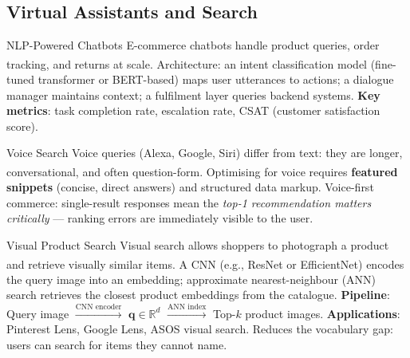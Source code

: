 \subsection{Virtual Assistants and Search}


\begin{v3topic}{NLP-Powered Chatbots}
    E-commerce chatbots handle product queries, order tracking, and returns at scale\textsuperscript{\cite[][pp.~150--155]{chaffeyDigitalBusinessECommerce2019}}.
    Architecture: an intent classification model (fine-tuned transformer or BERT-based) maps user utterances to actions; a dialogue manager maintains context; a fulfilment layer queries backend systems.
    \textbf{Key metrics}: task completion rate, escalation rate, CSAT (customer satisfaction score).

\end{v3topic}
\begin{v3topic}{Voice Search}
    Voice queries (Alexa, Google, Siri) differ from text: they are longer, conversational, and often question-form\textsuperscript{\cite[][pp.~155--158]{chaffeyDigitalBusinessECommerce2019}}.
    Optimising for voice requires \textbf{featured snippets} (concise, direct answers) and structured data markup.
    Voice-first commerce: single-result responses mean the \emph{top-1 recommendation matters critically} --- ranking errors are immediately visible to the user.

\end{v3topic}
\begin{v3topic}{Visual Product Search}
    Visual search allows shoppers to photograph a product and retrieve visually similar items\textsuperscript{\cite[][pp.~160--163]{chaffeyDigitalBusinessECommerce2019}}.
    A CNN (e.g., ResNet or EfficientNet) encodes the query image into an embedding; approximate nearest-neighbour (ANN) search retrieves the closest product embeddings from the catalogue.
\visualseparator
    \textbf{Pipeline}: Query image $\xrightarrow{\text{CNN encoder}}$ $\mathbf{q} \in \mathbb{R}^d$ $\xrightarrow{\text{ANN index}}$ Top-$k$ product images.
    \textbf{Applications}: Pinterest Lens, Google Lens, ASOS visual search. Reduces the vocabulary gap: users can search for items they cannot name.

\end{v3topic}

